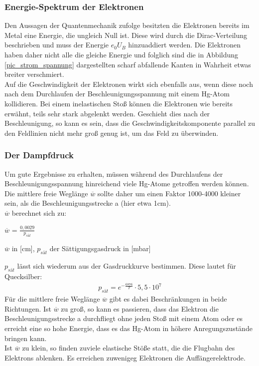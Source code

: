 \subsubsection{Energie-Spektrum der Elektronen}
Den Aussagen der Quantenmechanik zufolge besitzten die Elektronen bereits im Metal eine Energie, die ungleich Null ist. Diese wird durch die Dirac-Verteilung beschrieben und muss der Energie $e_0 U_B$ hinzuaddiert werden.
Die Elektronen haben daher nicht alle die gleiche Energie und folglich sind die in Abbildung \ref{pic_strom_spannung} dargestellten scharf abfallende Kanten in Wahrheit etwas breiter verschmiert.\\
Auf die Geschwindigkeit der Elektronen wirkt sich ebenfalls aus, wenn diese noch nach dem Durchlaufen der Beschleunigungsspannung mit einem Hg-Atom kollidieren. Bei einem inelastischen Stoß können die Elektronen wie bereits erwähnt, teils sehr stark abgelenkt werden. Geschieht dies nach der Beschleunigung, so kann  es sein, dass die Geschwindigkeitskomponente parallel zu den Feldlinien nicht mehr groß genug ist, um das Feld zu überwinden.
\subsubsection{Der Dampfdruck}
Um gute Ergebnisse zu erhalten, müssen während des Durchlaufens der Beschleunigungsspannung hinreichend viele Hg-Atome getroffen werden können. Die mittlere freie Weglänge $\overline{w}$ sollte daher um einen Faktor 1000-4000 kleiner sein, als die Beschleunigungsstrecke a (hier etwa 1cm).\\

$\overline{w}$ berechnet sich zu:
\begin{formel}[H]
\centering
$\overline{w}$ = $\frac{0,0029}{p_{sät}}$
\caption*{\small{$\overline{w}$ in [cm], $p_{sät}$ der Sättigungsgasdruck in [mbar]}}
\end{formel}
$p_{sät}$ lässt sich wiederum aus der Gasdruckkurve bestimmen. Diese lautet für Quecksilber:
\begin{align}
p_{sät} = 	e^{-\frac{6876}{T}} \cdot 5,5 \cdot10^{7}
\label{eq_sättigungsdruck}
\end{align}
Für die mittlere freie Weglänge $\overline{w}$ gibt es dabei Beschränkungen in beide Richtungen. Ist $\overline{w}$ zu groß, so kann es passieren, dass das Elektron die Beschleunigungsstrecke a durchfliegt ohne jeden Stoß mit einem Atom oder es erreicht eine so hohe Energie, dass es das Hg-Atom in höhere Anregungszustände bringen kann.\\
Ist $\overline{w}$ zu klein, so finden zuviele elastische Stöße statt, die die Flugbahn des Elektrons ablenken. Es erreichen zuwenigeg Elektronen die Auffängerelektrode.
